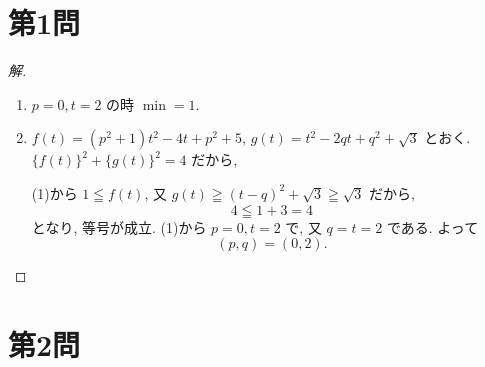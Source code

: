 \documentclass[../main.tex]{subfiles}
\begin{document}
\section*{第1問}

\begin{proof}[解]
  \begin{enumerate}
    \item[(1)] $p=0, t=2$ の時 $\min = 1$.

    \item[(2)] $f(t)=(p^2+1)t^2-4t+p^2+5$, $g(t)=t^2-2qt+q^2+\sqrt{3}$ とおく. $\{f(t)\}^2+\{g(t)\}^2=4$ だから,

      (1)から $1 \leqq f(t)$, 又 $g(t) \geqq (t-q)^2+\sqrt{3} \geqq \sqrt{3}$ だから,
      \[
        4 \leqq 1 + 3 = 4
      \]
      となり, 等号が成立. (1)から $p=0, t=2$ で, 又 $q=t=2$ である. よって
      \[
        (p, q) = (0, 2).
      \]
  \end{enumerate}
\end{proof}

\section*{第2問}
\end{document}
